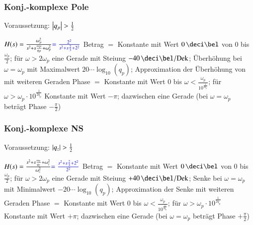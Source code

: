 \begin{minipage}[t]{0.48\columnwidth}
    \raggedright
    \subsubsection{Konj.-komplexe Pole}

    Voraussetzung: $\left|q_p\right| > \frac{1}{2}$

    \begin{outline}
        \1 $H(s) = \frac{\omega_p^2}{s^2 + s \frac{\omega_p}{q_p} + \omega_p^2} {\color{blue}= \frac{2^2}{s^2 + s \frac{2}{3} + 2^2}}$
            \2 Betrag $=$ Konstante mit Wert $0 \, \deci \bel$ von $0$ bis $\frac{\omega_p}{2}$; 
                für $\omega > 2\omega_p$ eine Gerade mit Steiung $- 40 \, \deci \bel / \Dek$; 
                Überhöhung bei $\omega = \omega_p$ mit Maximalwert $20 \cdots \log_{10}(q_p)$;
                Approximation der Überhöhung von mit weiteren Geraden
            \2 Phase $=$ Konstante mit Wert $0$ bis $\omega < \frac{\omega_p}{10^{\frac{1}{2 q_p}}}$; 
                für $\omega > \omega_p \cdot 10^{\frac{1}{2 q_p}}$  Konstante mit Wert $-\pi$; dazwischen eine Gerade
                (bei $\omega = \omega_p$ beträgt Phase $- \frac{\pi}{2}$)
    \end{outline}
\end{minipage}
\begin{minipage}[t]{0.48\columnwidth}
    \raggedright
    \subsubsection{Konj.-komplexe NS} 

    Voraussetzung: $\left|q_z\right| > \frac{1}{2}$

    \begin{outline}
        \1 $H(s) = \frac{s^2 + s \frac{\omega_z}{q_z} + \omega_z^2}{\omega_z^2} {\color{blue}= \frac{s^2 + s \frac{2}{3} + 2^2}{2^2}}$
            \2 Betrag $=$ Konstante mit Wert $0 \, \deci \bel$ von $0$ bis $\frac{\omega_p}{2}$; 
                für $\omega > 2\omega_p$ eine Gerade mit Steiung $+ 40 \, \deci \bel / \Dek$; 
                Senke bei $\omega = \omega_p$ mit Minimalwert $-20 \cdots \log_{10}(q_p)$;
                Approximation der Senke mit weiteren Geraden
            \2 Phase $=$ Konstante mit Wert $0$ bis $\omega < \frac{\omega_p}{10^{\frac{1}{2 q_p}}}$; 
                für $\omega > \omega_p \cdot 10^{\frac{1}{2 q_p}}$  Konstante mit Wert $+\pi$; dazwischen eine Gerade
                (bei $\omega = \omega_p$ beträgt Phase $+ \frac{\pi}{2}$)
    \end{outline}

\end{minipage}


